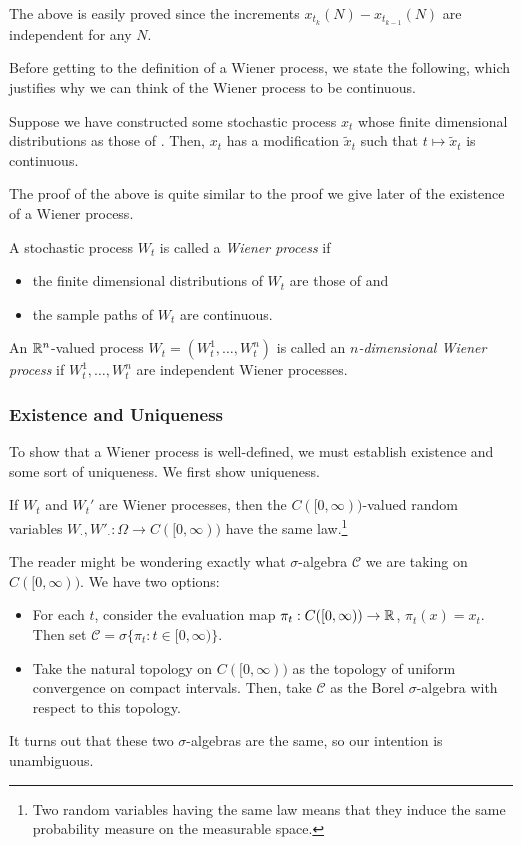 	The above is easily proved since the increments $x_{t_k}(N) - x_{t_{k-1}}(N)$ are independent for any $N$.

	Before getting to the definition of a Wiener process, we state the following, which justifies why we can think of the Wiener process to be continuous.

	\begin{lemma}
		Suppose we have constructed some stochastic process $x_t$ whose finite dimensional distributions as those of . Then, $x_t$ has a modification $\tilde{x}_t$ such that $t\mapsto\tilde{x}_t$ is continuous.
	\end{lemma}

	The proof of the above is quite similar to the proof we give later of the existence of a Wiener process.

	\begin{fdef}
		\label{def: wiener}
		A stochastic process $W_t$ is called a \textit{Wiener process} if
		\begin{itemize}
			\item the finite dimensional distributions of $W_t$ are those of \Cref{finite wiener} and
			\item the sample paths of $W_t$ are continuous.
		\end{itemize}
	\end{fdef}

	An $\mathbb{R}^n$-valued process $W_t = (W_t^1,\ldots,W_t^n)$ is called an \textit{$n$-dimensional Wiener process} if $W_t^1,\ldots,W_t^n$ are independent Wiener processes.

	\subsubsection{Existence and Uniqueness}

	To show that a Wiener process is well-defined, we must establish existence and some sort of uniqueness. We first show uniqueness.

	\begin{lemma}
		If $W_t$ and $W_t'$ are Wiener processes, then the $C([0,\infty))$-valued random variables $W_{\cdot},W'_{\cdot}:\Omega\to C([0,\infty))$ have the same law.\footnote{Two random variables having the same law means that they induce the same probability measure on the measurable space.}
	\end{lemma}

	The reader might be wondering exactly what $\sigma$-algebra $\mathcal{C}$ we are taking on $C([0,\infty))$. We have two options:
	\begin{itemize}
		\item For each $t$, consider the evaluation map $\pi_t:C([0,\infty))\to\mathbb{R}$, $\pi_t(x)=x_t$. Then set $\mathcal{C}=\sigma\{\pi_t : t\in[0,\infty)\}$.
		\item Take the natural topology on $C([0,\infty))$ as the topology of uniform convergence on compact intervals. Then, take $\mathcal{C}$ as the Borel $\sigma$-algebra with respect to this topology.
	\end{itemize}
	It turns out that these two $\sigma$-algebras are the same, so our intention is unambiguous.

